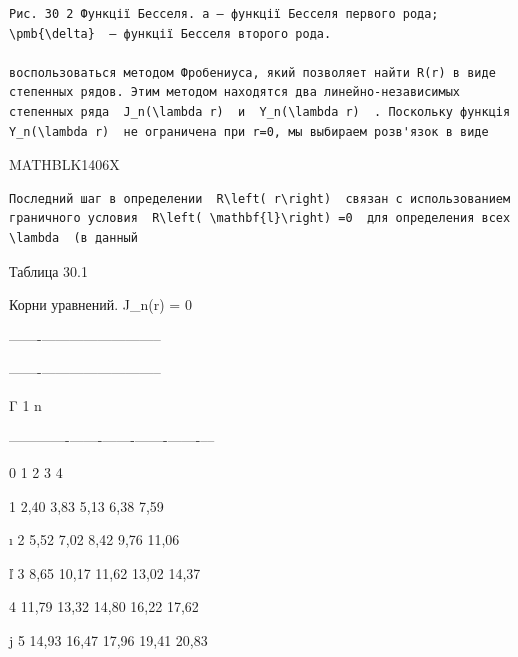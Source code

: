 \documentclass[
  ukrainian,
]{article}
\begin{document}
\begin{verbatim}
Рис. 30 2 Функції Бесселя. a — функції Бесселя первого рода;  \pmb{\delta}  — функції Бесселя второго рода.

воспользоваться методом Фробениуса, який позволяет найти R(r) в виде степенных рядов. Этим методом находятся два линейно-независимых степенных ряда  J_n(\lambda r)  и  Y_n(\lambda r)  . Поскольку функція  Y_n(\lambda r)  не ограничена при r=0, мы выбираем розв'язок в виде
\end{verbatim}

MATHBLK1406X

\begin{verbatim}
Последний шаг в определении  R\left( r\right)  связан с использованием граничного условия  R\left( \mathbf{l}\right) =0  для определения всех  \lambda  (в данный
\end{verbatim}

Таблица 30.1

Корни \textbar{} уравнений. \textbar{} J\_n(r) = 0 \textbar{}

\textbar-------\textbar------------\textbar--------------\textbar{}

\textbar-------\textbar------------\textbar--------------\textbar{}

Γ \textbar{} 1 \textbar{} n \textbar{} \textbar{} \textbar{} \textbar{}
\textbar{} \textbar{} \textbar{}

\textbar---\textbar---\textbar-------\textbar-------\textbar-------\textbar-------\textbar-------\textbar--\textbar--\textbar{}

\textbar{} \textbar{} 0 \textbar{} 1 \textbar{} 2 \textbar{} 3
\textbar{} 4 \textbar{} \textbar{} \textbar{}

\textbar{} 1 \textbar{} 2,40 \textbar{} 3,83 \textbar{} 5,13 \textbar{}
6,38 \textbar{} 7,59 \textbar{} \textbar{} \textbar{}

ı \textbar{} 2 \textbar{} 5,52 \textbar{} 7,02 \textbar{} 8,42
\textbar{} 9,76 \textbar{} 11,06 \textbar{} \textbar{} \textbar{}

ľ \textbar{} 3 \textbar{} 8,65 \textbar{} 10,17 \textbar{} 11,62
\textbar{} 13,02 \textbar{} 14,37 \textbar{} \textbar{} \textbar{}

\textbar{} 4 \textbar{} 11,79 \textbar{} 13,32 \textbar{} 14,80
\textbar{} 16,22 \textbar{} 17,62 \textbar{} \textbar{} \textbar{}

j \textbar{} 5 \textbar{} 14,93 \textbar{} 16,47 \textbar{} 17,96
\textbar{} 19,41 \textbar{} 20,83 \textbar{} \textbar{} \textbar{}
\end{document}
